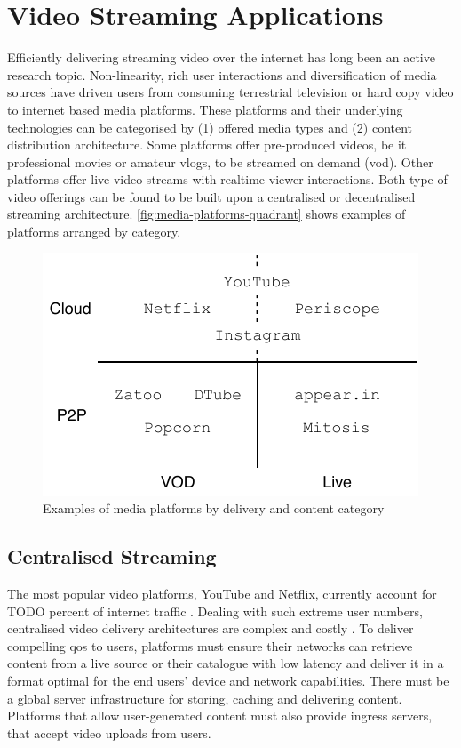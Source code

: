\section{Video Streaming Applications}

Efficiently delivering streaming video over the internet has long been an active research topic. Non-linearity, rich user interactions and diversification of media sources have driven users from consuming terrestrial television or hard copy video to internet based media platforms.
These platforms and their underlying technologies can be categorised by (1) offered media types and (2) content distribution architecture. Some platforms offer pre-produced videos, be it professional movies or amateur vlogs, to be streamed on demand (\gls{vod}). Other platforms offer live video streams with realtime viewer interactions.
Both type of video offerings can be found to be built upon a centralised or decentralised streaming architecture. \vref{fig:media-platforms-quadrant} shows examples of platforms arranged by category.

\begin{figure}
\centering
\includegraphics[width=.5\textwidth]{graphics/media-platforms-quadrant.pdf}
\caption{Examples of media platforms by delivery and content category}
\label{fig:media-platforms-quadrant}
\end{figure}

\subsection{Centralised Streaming}

The most popular video platforms, YouTube and Netflix, currently account for TODO percent of internet traffic \cite[p 18]{phenomena-report}. Dealing with such extreme user numbers, centralised video delivery architectures are complex and costly \cite{market-driven-p2p}. To deliver compelling \gls{qos} to users, platforms must ensure their networks can retrieve content from a live source or their catalogue with low latency and deliver it in a format optimal for the end users' device and network capabilities. There must be a global server infrastructure for storing, caching and delivering content. Platforms that allow user-generated content must also provide ingress servers, that accept video uploads from users.

